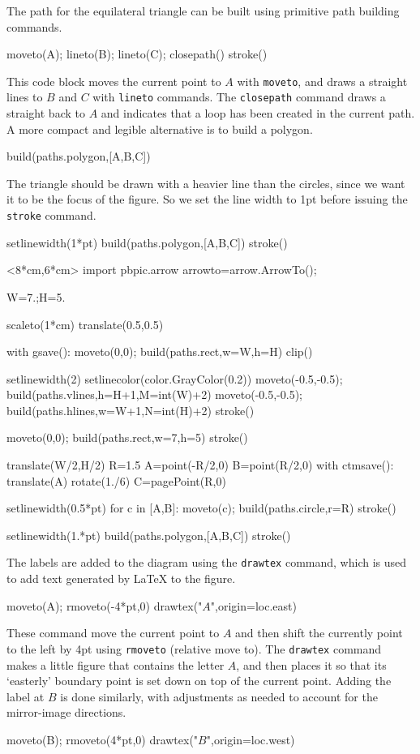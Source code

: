 \documentclass[12pt]{article}
\def\cmd#1{{\tt #1}}
\def\code#1{{\tt #1}}
\begin{document}
The path for the equilateral triangle can be built
using primitive path building commands.
\begin{snippet}
moveto(A); lineto(B); lineto(C); closepath()
stroke()
\end{snippet}
This code block moves the current point to $A$ with  \code{moveto}, 
and draws a straight lines to $B$ and $C$ with \code{lineto} commands.
The \code{closepath} command draws a straight back to $A$ and indicates 
that a loop has been created in the current path.  A more compact
and legible alternative is to build a polygon.
\begin{snippet}
build(paths.polygon,[A,B,C])
\end{snippet}

The triangle should be drawn with a heavier line than the circles,
since we want it to be the focus of the figure.  So we set the line width
to 1pt before issuing the \cmd{stroke} command.
\begin{snippet}
setlinewidth(1*pt)
build(paths.polygon,[A,B,C])
stroke()
\end{snippet}

\hfil\begin{pbpic}<8*cm,6*cm>
import pbpic.arrow
arrowto=arrow.ArrowTo();

W=7.;H=5.

scaleto(1*cm)
translate(0.5,0.5)

with gsave():
  moveto(0,0); build(paths.rect,w=W,h=H)
  clip()
  
  setlinewidth(2)
  setlinecolor(color.GrayColor(0.2))
  moveto(-0.5,-0.5); build(paths.vlines,h=H+1,M=int(W)+2)
  moveto(-0.5,-0.5); build(paths.hlines,w=W+1,N=int(H)+2)
  stroke()

moveto(0,0); build(paths.rect,w=7,h=5)
stroke()

translate(W/2,H/2)
R=1.5
A=point(-R/2,0)
B=point(R/2,0)
with ctmsave():
  translate(A)
  rotate(1./6)
  C=pagePoint(R,0)

setlinewidth(0.5*pt)
for c in [A,B]:
  moveto(c);
  build(paths.circle,r=R)
  stroke()
  
setlinewidth(1.*pt)
build(paths.polygon,[A,B,C])
stroke()
\end{pbpic}

The labels are added to the diagram using the \code{drawtex} command,
which is used to add text generated by LaTeX to the figure.
\begin{snippet}
moveto(A); rmoveto(-4*pt,0)
drawtex("$A$",origin=loc.east)
\end{snippet}
These command move the current point to $A$ and then shift
the currently point to the left by 4pt using \code{rmoveto} (relative
move to).  The \code{drawtex} command makes a little figure that contains
the letter $A$, and then places it so that its `easterly' boundary point is set down on top of the current point.  Adding the label at $B$ is
done similarly, with adjustments as needed to account for the mirror-image
directions.
\begin{snippet}
moveto(B); rmoveto(4*pt,0)
drawtex("$B$",origin=loc.west)
\end{snippet}
\end{document}
